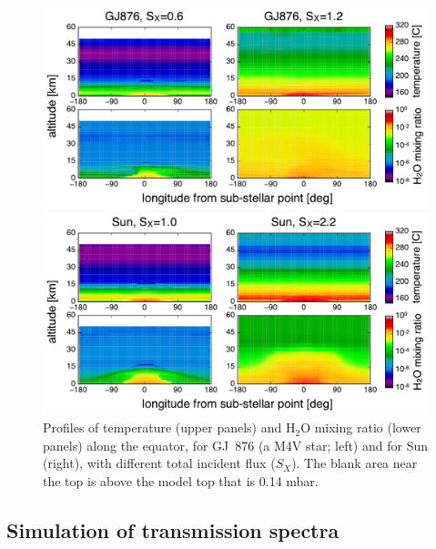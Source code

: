 \documentclass[11pt,numberedappendix,twocolappendix,]{emulateapj}
\def\water{H$_2$O }
\begin{document}
\begin{figure}[tb]
    \begin{minipage}{0.5\hsize}
\includegraphics[width=\hsize]{fig/AqOH0TLS_GJ876_temp_xH2O.pdf}
    \end{minipage}
    \begin{minipage}{0.5\hsize}
\includegraphics[width=\hsize]{fig/AqOH0TLS_Sun_temp_xH2O.pdf}
    \end{minipage}
    \caption{Profiles of temperature (upper panels) and \water mixing ratio (lower panels) along the equator, for GJ~876 (a M4V star; left) and for Sun (right), with different total incident flux ($S_X$). The blank area near the top is above the model top that is  0.14 mbar. }
\label{fig:3Dprofile_equator}
\end{figure}


\subsection{Simulation of transmission spectra}
\label{ss:method_TransmissionSpectra}
\end{document}
